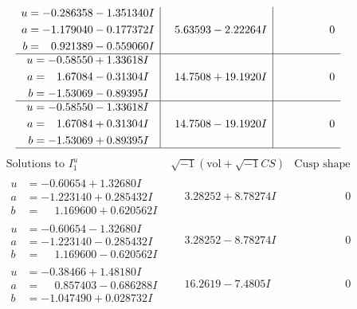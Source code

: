 \documentclass[1p]{elsarticle_modified}
\theoremstyle{definition}
\newcommand{\I}{\sqrt{-1}}
\begin{document}
$$\begin{array}{c|c|c}
\begin{aligned}
u &= -0.286358 - 1.351340 I \\
a &= -1.179040 - 0.177372 I \\
b &= \phantom{-}0.921389 - 0.559060 I\end{aligned}
 & \phantom{-}5.63593 - 2.22264 I & \phantom{-0.000000 } 0 \\ \hline\begin{aligned}
u &= -0.58550 + 1.33618 I \\
a &= \phantom{-}1.67084 - 0.31304 I \\
b &= -1.53069 - 0.89395 I\end{aligned}
 & \phantom{-}14.7508 + 19.1920 I & \phantom{-0.000000 } 0 \\ \hline\begin{aligned}
u &= -0.58550 - 1.33618 I \\
a &= \phantom{-}1.67084 + 0.31304 I \\
b &= -1.53069 + 0.89395 I\end{aligned}
 & \phantom{-}14.7508 - 19.1920 I & \phantom{-0.000000 } 0\\
 \hline 
 \end{array}$$\newpage$$\begin{array}{c|c|c}  
\text{Solutions to }I^u_{1}& \I (\text{vol} + \sqrt{-1}CS) & \text{Cusp shape}\\
 \hline 
\begin{aligned}
u &= -0.60654 + 1.32680 I \\
a &= -1.223140 + 0.285432 I \\
b &= \phantom{-}1.169600 + 0.620562 I\end{aligned}
 & \phantom{-}3.28252 + 8.78274 I & \phantom{-0.000000 } 0 \\ \hline\begin{aligned}
u &= -0.60654 - 1.32680 I \\
a &= -1.223140 - 0.285432 I \\
b &= \phantom{-}1.169600 - 0.620562 I\end{aligned}
 & \phantom{-}3.28252 - 8.78274 I & \phantom{-0.000000 } 0 \\ \hline\begin{aligned}
u &= -0.38466 + 1.48180 I \\
a &= \phantom{-}0.857403 - 0.686288 I \\
b &= -1.047490 + 0.028732 I\end{aligned}
 & \phantom{-}16.2619 - 7.4805 I & \phantom{-0.000000 } 0 \\ \hline\begin{aligned}

\end{aligned}
\end{array}$$
\end{document}
